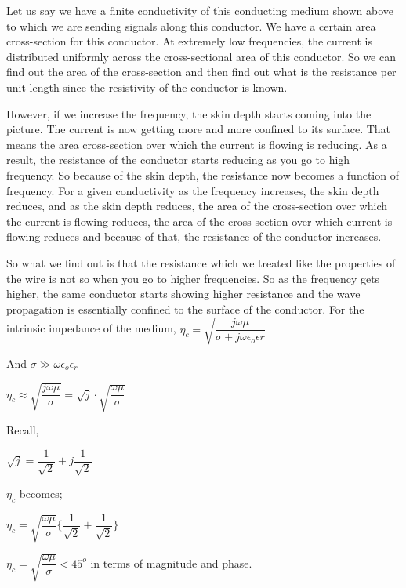 Let us say we have a finite conductivity of this conducting medium shown above to which we are sending signals along this conductor. We have a certain area cross-section for this conductor. At extremely low frequencies, the current is distributed uniformly across the cross-sectional area of this conductor. So we can find out the area of the cross-section and then find out what is the resistance per unit length since the resistivity of the conductor is known.

However, if we increase the frequency, the skin depth starts coming into the picture. The current is now getting more and more confined to its surface. That means the area cross-section over which the current is flowing is reducing. As a result, the resistance of the conductor starts reducing as you go to high frequency. So because of the skin depth, the resistance now becomes a function of frequency. For a given conductivity as the frequency increases, the skin depth reduces, and as the skin depth reduces, the area of the cross-section over which the current is flowing reduces, the area of the cross-section over which current is flowing reduces and because of that, the resistance of the conductor increases.

So what we find out is that the resistance which we treated like the properties of the wire is not so when you go to higher frequencies. So as the frequency gets higher, the same conductor starts showing higher resistance and the wave propagation is essentially confined to the surface of the conductor.
For the intrinsic impedance of the medium, $\eta_{c}=\sqrt{\dfrac{j\omega\mu}{\sigma+j\omega\epsilon_{o}\epsilon{r}}}$

And $\sigma\gg\omega\epsilon_{o}\epsilon_{r}$
\begin{center}
$\eta_{c}\approx\sqrt{\dfrac{j\omega\mu}{\sigma}}=\sqrt{j}\cdot\sqrt{\dfrac{\omega\mu}{\sigma}}$
\end{center}

Recall,
\begin{center}
$\sqrt{j}=\dfrac{1}{\sqrt{2}}+j\dfrac{1}{\sqrt{2}}$
\end{center}

$\eta_{c}$ becomes;
\begin{center}
$\eta_{c}=\sqrt{\dfrac{\omega\mu}{\sigma}}\Bigg\{\dfrac{1}{\sqrt{2}}+\dfrac{1}{\sqrt{2}}\Bigg\}$
\end{center} 

\begin{center}
$\eta_{c}=\sqrt{\dfrac{\omega\mu}{\sigma}}<45^{o}$ in terms of magnitude and phase.
\end{center}

